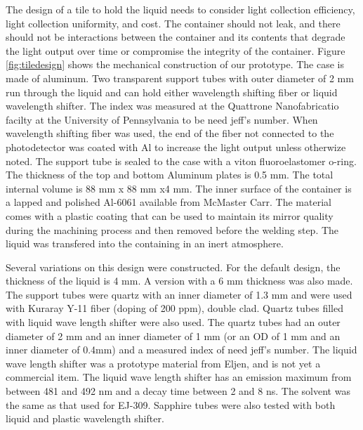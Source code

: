 \documentclass[review]{elsarticle}
\begin{document}
The design of a tile to hold the liquid needs to consider light
collection efficiency, light collection uniformity, and cost.  The
container should not leak, and there should not be interactions
between the container and its contents that degrade the light output
over time or compromise the integrity of the container.  Figure
\ref{fig:tiledesign} shows the mechanical construction of our
prototype.  The case is made of aluminum.  Two transparent support
tubes with outer diameter of 2 mm run through the liquid and can hold
either wavelength shifting fiber or liquid wavelength shifter.  The
index was measured at the Quattrone Nanofabricatio facilty at the
University of Pennsylvania to be {\color{red} need jeff's number}.
When wavelength shifting fiber was used, the end of the fiber not
connected to the photodetector was coated with Al to increase the
light output unless otherwize noted.  The support tube is sealed to
the case with a viton fluoroelastomer o-ring.  The thickness of the
top and bottom Aluminum plates is 0.5 mm.  The total internal volume
is 88 mm x 88 mm x4 mm. The inner surface of the container is a lapped
and polished Al-6061 available from McMaster Carr. The material comes
with a plastic coating that can be used to maintain its mirror quality
during the machining process and then removed before the welding step.
The liquid was transfered into the containing in an inert atmosphere.

Several variations on this design were constructed.  For the default
design, the thickness of the liquid is 4 mm.  A version with a 6 mm
thickness was also made.  The support tubes were quartz with an inner
diameter of 1.3 mm and were used with Kuraray Y-11 fiber (doping of
200 ppm), double clad.  Quartz tubes filled with liquid wave length
shifter were also used.  The quartz tubes had an outer diameter of 2
mm and an inner diameter of 1 mm (or an OD of 1 mm and an inner
diameter of 0.4mm) and a measured index of {\color{red} need jeff's
  number}.  The liquid wave length shifter was a prototype material
from Eljen, and is not yet a commercial item.  The liquid wave length
shifter has an emission maximum from between 481 and 492 nm and a
decay time between 2 and 8 ns.  The solvent was the same as that used
for EJ-309.  Sapphire tubes were also tested with both liquid and
plastic wavelength shifter.
\end{document}
